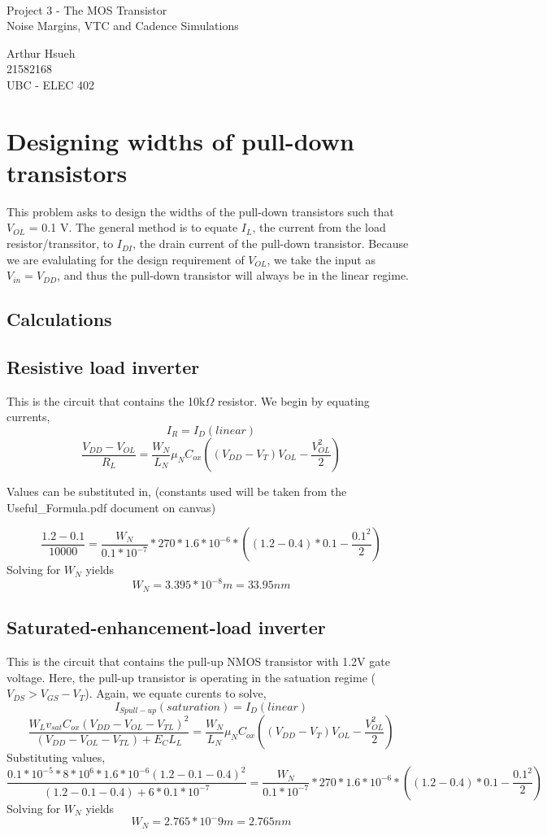 \documentclass[12pt]{article}
\newcommand{\doctitle}{Project 3 - The MOS Transistor}
\newcommand{\docsubtitle}{Noise Margins, VTC and Cadence Simulations}
\renewcommand{\maketitle} {
    \setlength{\parindent}{0pt}
    \begin{center} \
        \vspace*{1in}

        \huge{\doctitle}\\
        \Large{\docsubtitle}

        \vspace*{0.2in}
        \large{
            Arthur Hsueh\\
            21582168\\
            UBC - ELEC 402
        }


    \end{center}
}
\begin{document}
\maketitle
\thispagestyle{empty}
\pagebreak

\tableofcontents
\thispagestyle{empty}

\listoffigures
\thispagestyle{empty}
\pagebreak
\setcounter{page}{1}

\section{Designing widths of pull-down transistors}
This problem asks to design the widths of the pull-down transistors such that $V_{OL}$ = 0.1 V. The general
method is to equate $I_{L}$, the current from the load resistor/transsitor, to $I_{DI}$, the drain current of the 
pull-down transistor. Because we are evalulating for the design requirement of $V_{OL}$, we take the input as
$V_{in} = V_{DD}$, and thus the pull-down transistor will always be in the linear regime.

\subsection{Calculations}
\subsection*{Resistive load inverter}
This is the circuit that contains the 10k$\Omega$ resistor. We begin by equating currents,
\[ I_R = I_{D}(linear) \]
\[\frac{V_{DD} - V_{OL}}{R_L} = \frac{W_N}{L_N} \mu_N C_{ox} ((V_{DD} - V_T) V_{OL} - \frac{V_{OL}^2}{2}) \]

Values can be substituted in, (constants used will be taken from the Useful\_Formula.pdf document on canvas)

\[\frac{1.2 - 0.1}{10000} = \frac{W_N}{0.1*10^{-7}}*270*1.6*10^{-6} *((1.2 - 0.4)*0.1 - \frac{0.1^2}{2}) \]
Solving for $W_N$ yields
\[ W_N = 3.395 * 10^{-8}m = 33.95 nm\]

\subsection*{Saturated-enhancement-load inverter}
This is the circuit that contains the pull-up NMOS transistor with 1.2V gate voltage. Here, the pull-up
transistor is operating in the satuation regime ($V_{DS} > V_{GS} - V_T$). Again, we equate curents to solve,
\[ I_{S pull-up}(saturation) = I_{D}(linear)\]
\[\frac{W_L v_{sat}C_{ox}(V_{DD} - V_{OL} - V_{TL})^2}{(V_{DD} - V_{OL} - V_{TL}) + E_C L_L} = \frac{W_N}{L_N} \mu_N C_{ox} ((V_{DD} - V_T)V_{OL} - \frac{V_{OL}^2}{2}) \]
Substituting values,
\[\frac{0.1*10^{-5}* 8*10^6 *1.6 * 10^{-6}(1.2 - 0.1 - 0.4)^2}{(1.2 - 0.1 - 0.4) + 6*0.1*10^{-7}} = \frac{W_N}{0.1*10^{-7}}*270*1.6*10^{-6} *((1.2 - 0.4)*0.1 - \frac{0.1^2}{2})\]
Solving for $W_N$ yields
\[ W_N = 2.765*10^-9m = 2.765nm\]
\end{document}
